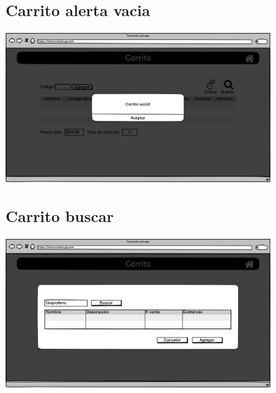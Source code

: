 \begin{flushleft}
\begin{center}
	\end{center}
	\subsection{Carrito alerta vacia} \label{UI: carrito alerta vacia}
	\begin{center}
		\includegraphics[width=10cm]{pantallas/images/3carritovacio.png}\\	
		 	
	\end{center}
	\subsection{Carrito buscar} \label{UI: carrito buscar}
	\begin{center}
		\includegraphics[width=10cm]{pantallas/images/4carritobuscar.png}\\	
		 	
	\end{center}

\end{flushleft}
